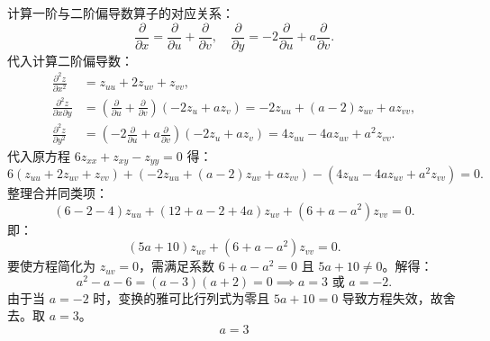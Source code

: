 \begin{solution}
    计算一阶与二阶偏导数算子的对应关系：
    \begin{equation}
        \frac{\partial}{\partial x} = \frac{\partial}{\partial u} + \frac{\partial}{\partial v}, \quad \frac{\partial}{\partial y} = -2\frac{\partial}{\partial u} + a\frac{\partial}{\partial v}.
    \end{equation}
    代入计算二阶偏导数：
    \begin{equation}
        \begin{aligned}
            \frac{\partial^2 z}{\partial x^2}          & = z_{uu} + 2z_{uv} + z_{vv},                                                                                                                 \\
            \frac{\partial^2 z}{\partial x \partial y} & = \left( \frac{\partial}{\partial u} + \frac{\partial}{\partial v} \right) \left( -2z_u + az_v \right) = -2z_{uu} + (a-2)z_{uv} + az_{vv},   \\
            \frac{\partial^2 z}{\partial y^2}          & = \left( -2\frac{\partial}{\partial u} + a\frac{\partial}{\partial v} \right) \left( -2z_u + az_v \right) = 4z_{uu} - 4az_{uv} + a^2 z_{vv}.
        \end{aligned}
    \end{equation}
    代入原方程 $6z_{xx} + z_{xy} - z_{yy} = 0$ 得：
    \begin{equation}
        6(z_{uu} + 2z_{uv} + z_{vv}) + (-2z_{uu} + (a-2)z_{uv} + az_{vv}) - (4z_{uu} - 4az_{uv} + a^2 z_{vv}) = 0.
    \end{equation}
    整理合并同类项：
    \begin{equation}
        (6 - 2 - 4)z_{uu} + (12 + a - 2 + 4a)z_{uv} + (6 + a - a^2)z_{vv} = 0.
    \end{equation}
    即：
    \begin{equation}
        (5a + 10)z_{uv} + (6 + a - a^2)z_{vv} = 0.
    \end{equation}
    要使方程简化为 $z_{uv} = 0$，需满足系数 $6 + a - a^2 = 0$ 且 $5a + 10 \neq 0$。解得：
    \begin{equation}
        a^2 - a - 6 = (a - 3)(a + 2) = 0 \implies a = 3 \text{ 或 } a = -2.
    \end{equation}
    由于当 $a = -2$ 时，变换的雅可比行列式为零且 $5a + 10 = 0$ 导致方程失效，故舍去。取 $a = 3$。
    \begin{equation}
        \boxed{a = 3}
    \end{equation}
\end{solution}



